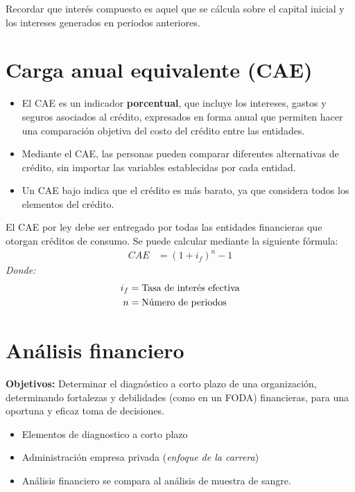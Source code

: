 \documentclass{templateNote}
\begin{document}
\begin{tcolorbox}[colback=orange!10!white,colframe=orange!60!black,title=Observación]
    Recordar que interés compuesto es aquel que se cálcula sobre el capital inicial y los intereses generados en periodos anteriores.
\end{tcolorbox}

\section{Carga anual equivalente (CAE)}
\begin{itemize}
    \item El CAE es un indicador \textbf{porcentual}, que incluye los intereses, gastos y seguros asociados al crédito, expresados en forma anual que 
        permiten hacer una comparación objetiva del costo del crédito entre las entidades.
    \item Mediante el CAE, las personas pueden comparar diferentes alternativas de crédito, sin importar las variables establecidas por cada entidad.
    \item Un CAE bajo indica que el crédito es más barato, ya que considera todos los elementos del crédito.
\end{itemize}
\noindent El CAE por ley debe ser entregado por todas las entidades financieras que otorgan créditos de consumo. Se puede calcular mediante la siguiente fórmula:
\begin{align*}
    CAE &= (1+i_f)^n - 1
\end{align*}
\textit{Donde:}
\begin{align*}
    i_f &= \textnormal{Tasa de interés efectiva}\\
    n &= \textnormal{Número de periodos}
\end{align*}
\newpage

\section{Análisis financiero}
\noindent \textbf{Objetivos:} Determinar el diagnóstico a corto plazo de una organización, determinando fortalezas y debilidades (como en un FODA) 
    financieras, para una oportuna y eficaz toma de decisiones.\\ 
\begin{itemize}
    \item Elementos de diagnostico a corto plazo
    \item Administración empresa privada (\textit{enfoque de la carrera})
    \item Análisis financiero se compara al análisis de muestra de sangre.
\end{itemize}
\end{document}
